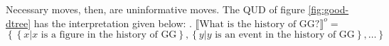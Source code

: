 \documentclass[letterpaper]{article}
\begin{document}
Necessary moves, then, are uninformative moves.
The QUD of figure \ref{fig:good-dtree} has the interpretation given below:
\ex. $\llbracket\text{What is the history of GG?}\rrbracket^o =$\\
$\left\{ \left\{ x | x \text{ is a figure in the history of GG} \right\}, \left\{ y | y \text{ is an event in the history of GG} \right\},\dots \right\}$
\end{document}
